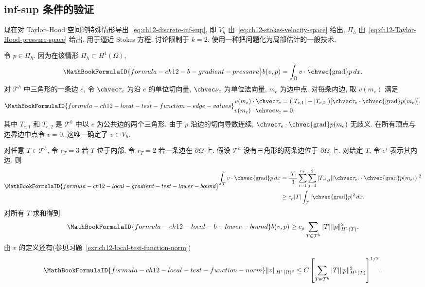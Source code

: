 \subsection{inf-sup 条件的验证}
\label{sec:ch12-inf-sup-verification}
\setcounter{thmcount}{0}
\setcounter{equation}{0}

现在对 Taylor--Hood 空间的特殊情形导出~\eqref{eq:ch12-discrete-inf-sup}, 即 $V_h$ 由~\eqref{eq:ch12-stokes-velocity-space} 给出, $\Pi_h$ 由~\eqref{eq:ch12-Taylor-Hood-pressure-space} 给出, 用于逼近 Stokes 方程. 讨论限制于 $k=2$. 使用一种把问题化为局部估计的一般技术.

令 $p\in\Pi_h$. 因为在该情形 $\Pi_h\subset H^1(\Omega)$,
\[
\MathBookFormulaID{formula-ch12-b-gradient-pressure}
b(v,p)=\int_\Omega v\cdot\chvec{\operatorname{grad}}p\,dx.
\]
对 $\mathcal T^h$ 中三角形的一条边 $e$, 令 $\chvec\tau_e$ 为沿 $e$ 的单位切向量, $\chvec\nu_e$ 为单位法向量, $m_e$ 为边中点. 对每条内边, 取 $v(m_e)$ 满足
\[
\MathBookFormulaID{formula-ch12-local-test-function-edge-values}
\begin{aligned}
v(m_e)\cdot\chvec\tau_e
&=(|T_{e,1}|+|T_{e,2}|)
[\chvec\tau_e\cdot\chvec{\operatorname{grad}}p(m_e)],\\
v(m_e)\cdot\chvec\nu_e&=0,
\end{aligned}
\]
其中 $T_{e,1}$ 和 $T_{e,2}$ 是 $\mathcal T^h$ 中以 $e$ 为公共边的两个三角形. 由于 $p$ 沿边的切向导数连续, $\chvec\tau_e\cdot\chvec{\operatorname{grad}}p(m_e)$ 无歧义. 在所有顶点与边界边中点令 $v=0$. 这唯一确定了 $v\in V_h$.

对任意 $T\in\mathcal T^h$, 令 $r_T=3$ 若 $T$ 位于内部, 令 $r_T=2$ 若一条边在 $\partial\Omega$ 上. 假设 $\mathcal T^h$ 没有三角形的两条边位于 $\partial\Omega$ 上. 对给定 $T$, 令 $e^i$ 表示其内边. 则
\[
\MathBookFormulaID{formula-ch12-local-gradient-test-lower-bound}
\begin{aligned}
\int_T v\cdot\chvec{\operatorname{grad}}p\,dx
&=\frac{|T|}{3}\sum_{i=1}^{r_T}
\sum_{j=1}^2|T_{e^i,j}|
|\chvec\tau_{e^i}\cdot\chvec{\operatorname{grad}}p(m_{e^i})|^2\\
&\geq c_\rho|T|\int_T|\chvec{\operatorname{grad}}p|^2\,dx.
\end{aligned}
\]
对所有 $T$ 求和得到
\begin{equation}
\MathBookFormulaID{formula-ch12-local-b-lower-bound}
\label{eq:ch12-local-b-lower-bound}
b(v,p)\geq c_\rho\sum_{T\in\mathcal T^h}
|T|\|p\|_{H^1(T)}^2.
\end{equation}
由 $v$ 的定义还有(参见习题~\ref{exr:ch12-local-test-function-norm})
\begin{equation}
\MathBookFormulaID{formula-ch12-local-test-function-norm}
\label{eq:ch12-local-test-function-norm}
\|v\|_{H^1(\Omega)^2}
\leq C\left[\sum_{T\in\mathcal T^h}
|T|\|p\|_{H^1(T)}^2\right]^{1/2}.
\end{equation}


